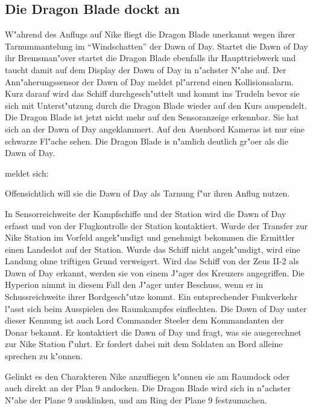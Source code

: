 \subsection{Die Dragon Blade dockt an}
W"ahrend des Anflugs auf Nike fliegt die Dragon Blade unerkannt wegen ihrer Tarnummantelung im "`Windschatten"' der Dawn of Day. Startet die Dawn of Day ihr Bremsman"over startet die Dragon Blade ebenfalls ihr Haupttriebwerk und taucht damit auf dem Display der Dawn of Day in n"achster N"ahe auf. Der Ann"aherungssensor der Dawn of Day meldet pl"arrend einen Kollisionsalarm. Kurz darauf wird das Schiff durchgesch"uttelt und kommt ins Trudeln bevor sie sich mit Unterst"utzung durch die Dragon Blade wieder auf den Kurs auspendelt. Die Dragon Blade ist jetzt nicht mehr auf den Sensoranzeige erkennbar. Sie hat sich an der Dawn of Day angeklammert. Auf den Au\3enbord Kameras ist nur eine schwarze Fl"ache sehen. Die Dragon Blade is n"amlich deutlich gr"o\3er als die Dawn of Day.

\xl{} meldet sich:


Offensichtlich will sie die Dawn of Day als Tarnung f"ur ihren Anflug nutzen.

In Sensorreichweite der Kampfschiffe und der Station wird die Dawn of Day erfasst und von der Flugkontrolle der Station kontaktiert. Wurde der Transfer zur Nike Station im Vorfeld angek"undigt und genehmigt bekommen die Ermittler einen Landeslot auf der Station. Wurde das Schiff nicht angek"undigt, wird eine Landung ohne triftigen Grund verweigert. Wird das Schiff von der Zeus II-2 als Dawn of Day erkannt, werden sie von einem J"ager des Kreuzers angegriffen. Die Hyperion nimmt in diesem Fall den J"ager unter Beschuss, wenn er in Schussreichweite ihrer Bordgesch"utze kommt. Ein entsprechender Funkverkehr l"asst sich beim Ausspielen des Raumkampfes einflechten. Die Dawn of Day unter dieser Kennung ist auch Lord Commander Steeler dem Kommandanten der Donar bekannt. Er kontaktiert die Dawn of Day und fragt, was sie ausgerechnet zur Nike Station f"uhrt. Er fordert dabei mit dem Soldaten an Bord alleine sprechen zu k"onnen.

Gelinkt es den Charakteren Nike anzufliegen k"onnen sie am Raumdock oder auch direkt an der Plan 9 andocken. Die Dragon Blade wird sich in n"achster N"ahe der Plane 9 ausklinken, und am Ring der Plane 9 festzumachen.

